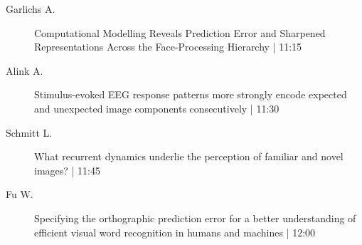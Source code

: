 \begin{symposium}
\begin{description}
                \item [ Garlichs A.] Computational Modelling Reveals Prediction Error and Sharpened Representations Across the Face-Processing Hierarchy \textcolor{mygray}{ | 11:15}    
                
                \item [ Alink A.] Stimulus-evoked EEG response patterns more strongly encode expected and unexpected image components consecutively \textcolor{mygray}{ | 11:30}    
                
                \item [ Schmitt L.] What recurrent dynamics underlie the perception of familiar and novel images? \textcolor{mygray}{ | 11:45}    
                
                \item [ Fu W.] Specifying the orthographic prediction error for a better understanding of efficient visual word recognition in humans and machines \textcolor{mygray}{ | 12:00}    
                
            \end{description} 
            \end{symposium}
            
